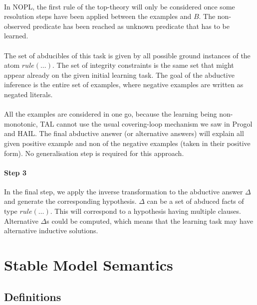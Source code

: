 \documentclass{article}
\theoremstyle{plain}
\theoremstyle{definition}
\begin{document}
\begin{multicols}{2}
\paragraph{} In NOPL, the first rule of the top-theory will only be considered once some resolution steps have been applied between the examples and $B$. The non-observed predicate has been reached as unknown predicate that has to be learned.

\paragraph{} The set of abducibles of this task is given by all possible ground instances of the atom $rule(\dots)$. The set of integrity constraints is the same set that might appear already on the given initial  learning task. The goal of the abductive inference is the entire set of examples, where negative examples are written as negated literals.

\paragraph{} All the examples are considered in one go, because the learning being non-monotonic, TAL cannot use the usual covering-loop mechanism we saw in Progol and HAIL. The final abductive answer (or alternative answers) will explain all given positive example and non of the negative examples (taken in their positive form). No generalisation step is required for this approach.

\paragraph{Step 3} In the final step, we apply the inverse transformation to the abductive answer $\Delta$ and generate the corresponding hypothesis. $\Delta$ can be a set of abduced facts of type $rule(\dots)$. This will correspond to a hypothesis having multiple clauses. Alternative $\Delta$s could be computed, which means that the learning task may have alternative inductive solutions.

\section{Stable Model Semantics}

\subsection{Definitions}


\end{multicols}
\end{document}
